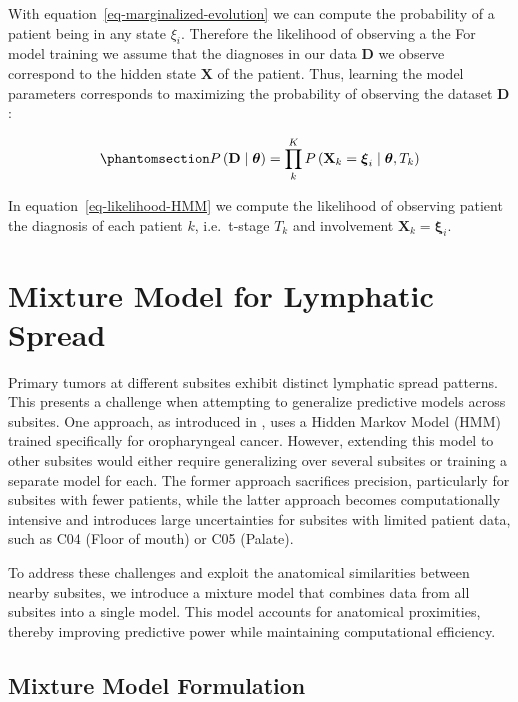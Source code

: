 \documentclass[
  sn-mathphys-num,
]{sn-jnl}
\begin{document}
With equation~\ref{eq-marginalized-evolution} we can compute the
probability of a patient being in any state \(\xi_i\). Therefore the
likelihood of observing a the For model training we assume that the
diagnoses in our data \(\mathbf{D}\) we observe correspond to the hidden
state \(\mathbf{X}\) of the patient. Thus, learning the model parameters
corresponds to maximizing the probability of observing the dataset
\(\mathbf{D}\):

\begin{equation}\phantomsection\label{eq-likelihood-HMM}{
P \left( \mathbf{D} \mid \boldsymbol{\theta} \right) = \prod_k^K P \left( \mathbf{X}_k=\boldsymbol{\xi}_i \mid \boldsymbol{\theta}, T_k \right)
}\end{equation}

In equation~\ref{eq-likelihood-HMM} we compute the likelihood of
observing patient the diagnosis of each patient \(k\), i.e.~t-stage
\(T_k\) and involvement \(\mathbf{X}_k=\boldsymbol{\xi}_i\).

\section{Mixture Model for Lymphatic Spread}\label{sec-mixture}

Primary tumors at different subsites exhibit distinct lymphatic spread
patterns. This presents a challenge when attempting to generalize
predictive models across subsites. One approach, as introduced in
\citep{ludwig_dynamic_2021}, uses a Hidden Markov Model (HMM) trained
specifically for oropharyngeal cancer. However, extending this model to
other subsites would either require generalizing over several subsites
or training a separate model for each. The former approach sacrifices
precision, particularly for subsites with fewer patients, while the
latter approach becomes computationally intensive and introduces large
uncertainties for subsites with limited patient data, such as C04 (Floor
of mouth) or C05 (Palate).

To address these challenges and exploit the anatomical similarities
between nearby subsites, we introduce a mixture model that combines data
from all subsites into a single model. This model accounts for
anatomical proximities, thereby improving predictive power while
maintaining computational efficiency.

\subsection{Mixture Model Formulation}\label{mixture-model-formulation}
\end{document}
